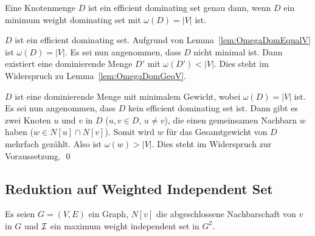 
\begin{Theorem}\label{theo:DEdIffOmegaEqV}
    Eine Knotenmenge $D$ ist ein efficient dominating set genau dann, wenn $D$ ein minimum weight dominating set mit $\omega(D)=|V|$ ist.
\end{Theorem}

\begin{Proof}
    \prR $D$ ist ein efficient dominating set. Aufgrund von Lemma~\ref{lem:OmegaDomEqualV} ist $\omega(D) = |V|$. Es sei nun angenommen, dass $D$ nicht minimal ist. Dann existiert eine dominierende Menge $D'$ mit $\omega(D') < |V|$. Dies steht im Widerspruch zu Lemma~\ref{lem:OmegaDomGeqV}.
    
    \prL $D$ ist eine dominierende Menge mit minimalem Gewicht, wobei $\omega(D) = |V|$ ist. Es sei nun angenommen, dass $D$ kein efficient dominating set ist. Dann gibt es zwei Knoten $u$ und $v$ in $D$ ($u,v \in D$, $u \neq v$), die einen gemeinsamen Nachbarn $w$ haben ($w \in N[u] \cap N[v]$). Somit wird $w$ für das Gesamtgewicht von $D$ mehrfach gezählt. Also ist $\omega(w) > |V|$. Dies steht im Widerspruch zur Voraussetzung.
    \qed
\end{Proof}

%
%
%
%
%

\subsection{Reduktion auf Weighted Independent Set}
Es seien $G=(V,E)$ ein Graph, $N[v]$ die abgeschlossene Nachbarschaft von $v$ in $G$ und $\mathcal{I}$ ein maximum weight independent set in $G^2$. 

